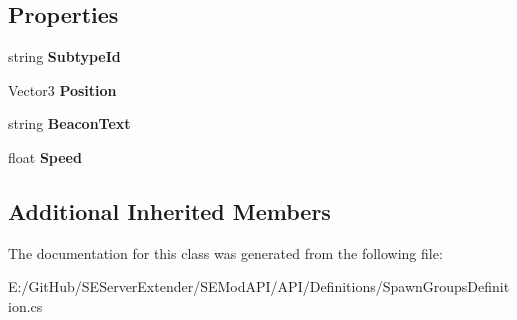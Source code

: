 \subsection*{Properties}
\begin{DoxyCompactItemize}
\item 
\hypertarget{class_s_e_mod_a_p_i_1_1_a_p_i_1_1_definitions_1_1_spawn_group_prefab_a0462698a8ce663783ff4159f72293ef8}{}string {\bfseries Subtype\+Id}\label{class_s_e_mod_a_p_i_1_1_a_p_i_1_1_definitions_1_1_spawn_group_prefab_a0462698a8ce663783ff4159f72293ef8}

\item 
\hypertarget{class_s_e_mod_a_p_i_1_1_a_p_i_1_1_definitions_1_1_spawn_group_prefab_a4f8d321057a41cfdc60479a0404620d8}{}Vector3 {\bfseries Position}\label{class_s_e_mod_a_p_i_1_1_a_p_i_1_1_definitions_1_1_spawn_group_prefab_a4f8d321057a41cfdc60479a0404620d8}

\item 
\hypertarget{class_s_e_mod_a_p_i_1_1_a_p_i_1_1_definitions_1_1_spawn_group_prefab_aba23aaa0afbada6e22f68b78c3e77d43}{}string {\bfseries Beacon\+Text}\label{class_s_e_mod_a_p_i_1_1_a_p_i_1_1_definitions_1_1_spawn_group_prefab_aba23aaa0afbada6e22f68b78c3e77d43}

\item 
\hypertarget{class_s_e_mod_a_p_i_1_1_a_p_i_1_1_definitions_1_1_spawn_group_prefab_ae9e78c90ab8371b8a62cd7650f886c5b}{}float {\bfseries Speed}\label{class_s_e_mod_a_p_i_1_1_a_p_i_1_1_definitions_1_1_spawn_group_prefab_ae9e78c90ab8371b8a62cd7650f886c5b}

\end{DoxyCompactItemize}
\subsection*{Additional Inherited Members}


The documentation for this class was generated from the following file\+:\begin{DoxyCompactItemize}
\item 
E\+:/\+Git\+Hub/\+S\+E\+Server\+Extender/\+S\+E\+Mod\+A\+P\+I/\+A\+P\+I/\+Definitions/Spawn\+Groups\+Definition.\+cs\end{DoxyCompactItemize}
